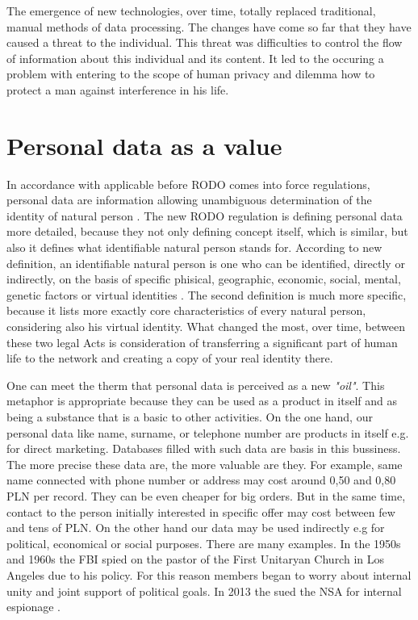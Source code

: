 \documentclass[en, noamssymb]{mgr}
\begin{document}
The emergence of new technologies, over time, totally replaced traditional, manual methods of data processing. The changes have come so far that they have caused a threat to the individual. This threat was difficulties to control the flow of information about this individual and its content. It led to the occuring a problem with entering to the scope of human privacy and dilemma how to protect a man against interference in his life.



\section{Personal data as a value}

In accordance with applicable before RODO comes into force regulations, personal data are information allowing unambiguous determination of the identity of natural person \cite{uodo_art6}. The new RODO regulation is defining personal data more detailed, because they not only defining concept itself, which is similar, but also it defines what identifiable natural person stands for. According to new definition, an identifiable natural person is one who can be identified, directly or indirectly, on the basis of specific phisical, geographic, economic, social, mental, genetic factors or virtual identities \cite{rodo_art4}. The second definition is much more specific, because it lists more exactly core characteristics of every natural person, considering also his virtual identity. What changed the most, over time, between these two legal Acts is consideration of transferring a significant part of human life to the network and creating a copy of your real identity there.

\indent One can meet the therm that personal data is perceived as a new \textit{"oil"}. This metaphor is appropriate because they can be used as a product in itself and as being a substance that is a basic to other activities. On the one hand, our personal data like name, surname, or telephone number are products in itself e.g. for direct marketing. Databases filled with such data are basis in this bussiness. The more precise these data are, the more valuable are they. For example, same name connected with phone number or address may cost around 0,50 and 0,80 PLN per record. They can be even cheaper for big orders. But in the same time, contact to the person initially interested in specific offer may cost between few and tens of PLN. On the other hand our data may be used indirectly e.g for political, economical or social purposes. There are many examples. In the 1950s and 1960s the FBI spied on the pastor of the First Unitaryan Church in Los Angeles due to his policy. For this reason members began to worry about internal unity and joint support of political goals. In 2013 the sued the NSA for internal espionage \cite{dane_i_goliat}.
\end{document}
